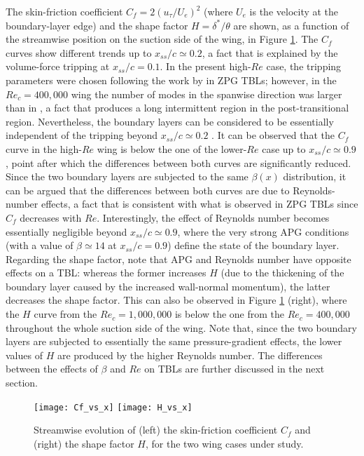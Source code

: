 The skin-friction coefficient $C_{f}= 2 \left (u_{\tau} / U_{e} \right )^{2}$ (where $U_{e}$ is the velocity at the boundary-layer edge) and the shape factor $H=\delta^{*} / \theta$ are shown, as a function of the streamwise position on the suction side of the wing, in Figure \ref{Cf_H}. The $C_{f}$ curves show different trends up to $x_{ss}/c \simeq 0.2$, a fact that is explained by the volume-force tripping at $x_{ss}/c=0.1$. In the present high-$Re$ case, the tripping parameters were chosen following the work by \cite{schlatter_orlu12} in ZPG TBLs; however, in the $Re_{c}=400,000$ wing the number of modes in the spanwise direction was larger than in \cite{schlatter_orlu12}, a fact that produces a long intermittent region in the post-transitional region. Nevertheless, the boundary layers can be considered to be essentially independent of the tripping beyond $x_{ss} / c \simeq 0.2$ \citep{vinuesa_diagnostic}. It can be observed that the $C_{f}$ curve in the high-$Re$ wing is below the one of the lower-$Re$ case up to $x_{ss}/c \simeq 0.9$, point after which the differences between both curves are significantly reduced. Since the two boundary layers are subjected to the same $\beta(x)$ distribution, it can be argued that the differences between both curves are due to Reynolds-number effects, a fact that is consistent with what is observed in ZPG TBLs since $C_{f}$ decreases with $Re$. Interestingly, the effect of Reynolds number becomes essentially negligible beyond $x_{ss}/c \simeq 0.9$, where the very strong APG conditions (with a value of $\beta \simeq 14$ at $x_{ss}/c=0.9$) define the state of the boundary layer. Regarding the shape factor, note that APG and Reynolds number have opposite effects on a TBL: whereas the former increases $H$ (due to the thickening of the boundary layer caused by the increased wall-normal momentum), the latter decreases the shape factor. This can also be observed in Figure \ref{Cf_H} (right), where the $H$ curve from the $Re_{c}=1,000,000$ is below the one from the $Re_{c}=400,000$ throughout the whole suction side of the wing. Note that, since the two boundary layers are subjected to essentially the same pressure-gradient effects, the lower values of $H$ are produced by the higher Reynolds number. The differences between the effects of $\beta$ and $Re$ on TBLs are further discussed in the next section.
\begin{figure}[t]
\centering
\texttt{[image: Cf\_vs\_x]}
\texttt{[image: H\_vs\_x]}
\caption{Streamwise evolution of (left) the skin-friction coefficient $C_{f}$ and (right) the shape factor $H$, for the two wing cases under study.}
\label{Cf_H}
\end{figure}


